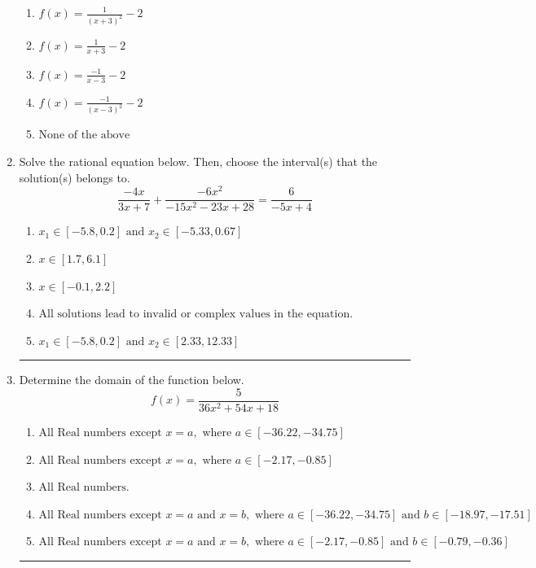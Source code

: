 \documentclass[14pt]{extbook}
\newcommand{\litem}[1]{\item#1\hspace*{-1cm}\rule{\textwidth}{0.4pt}}
\begin{document}
\begin{enumerate}
{\begin{center}
\end{center}
\begin{enumerate}[label=\Alph*.]
\item \( f(x) = \frac{1}{(x + 3)^2} - 2 \)
\item \( f(x) = \frac{1}{x + 3} - 2 \)
\item \( f(x) = \frac{-1}{x - 3} - 2 \)
\item \( f(x) = \frac{-1}{(x - 3)^2} - 2 \)
\item \( \text{None of the above} \)

\end{enumerate} }
\litem{
Solve the rational equation below. Then, choose the interval(s) that the solution(s) belongs to.\[ \frac{-4x}{3x + 7} + \frac{-6x^{2}}{-15x^{2} -23 x + 28} = \frac{6}{-5x + 4} \]\begin{enumerate}[label=\Alph*.]
\item \( x_1 \in [-5.8, 0.2] \text{ and } x_2 \in [-5.33,0.67] \)
\item \( x \in [1.7,6.1] \)
\item \( x \in [-0.1,2.2] \)
\item \( \text{All solutions lead to invalid or complex values in the equation.} \)
\item \( x_1 \in [-5.8, 0.2] \text{ and } x_2 \in [2.33,12.33] \)

\end{enumerate} }
\litem{
Determine the domain of the function below.\[ f(x) = \frac{5}{36x^{2} +54 x + 18} \]\begin{enumerate}[label=\Alph*.]
\item \( \text{All Real numbers except } x = a, \text{ where } a \in [-36.22, -34.75] \)
\item \( \text{All Real numbers except } x = a, \text{ where } a \in [-2.17, -0.85] \)
\item \( \text{All Real numbers.} \)
\item \( \text{All Real numbers except } x = a \text{ and } x = b, \text{ where } a \in [-36.22, -34.75] \text{ and } b \in [-18.97, -17.51] \)
\item \( \text{All Real numbers except } x = a \text{ and } x = b, \text{ where } a \in [-2.17, -0.85] \text{ and } b \in [-0.79, -0.36] \)


\end{enumerate}}
\end{enumerate}
\end{document}
